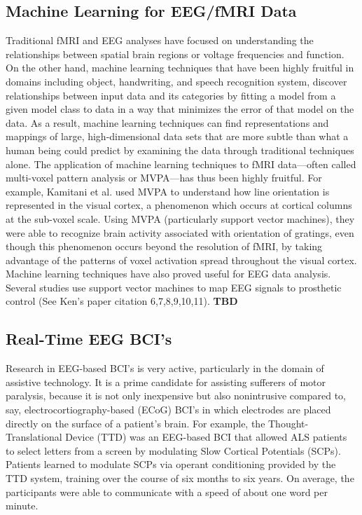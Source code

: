\documentclass[11pt]{report}
\begin{document}
\subsection{Machine Learning for EEG/fMRI Data}
Traditional fMRI and EEG analyses have focused on understanding the relationships between spatial brain regions or voltage frequencies and function.  On the other hand, machine learning techniques that have been highly fruitful in domains including object, handwriting, and speech recognition system, discover relationships between input data and its categories by fitting a model from a given model class to data in a way that minimizes the error of that model on the data.  As a result, machine learning techniques can find representations and mappings of large, high-dimensional data sets that are more subtle than what a human being could predict by examining the data through traditional techniques alone.  The application of machine learning techniques to fMRI data—often called multi-voxel pattern analysis or MVPA—has thus been highly fruitful\cite{Norman}.  For example, Kamitani et al. \cite{Kamitani} used MVPA to understand how line orientation is represented in the visual cortex, a phenomenon which occurs at cortical columns at the sub-voxel scale.   Using MVPA (particularly support vector machines), they were able to recognize brain activity associated with orientation of gratings, even though this phenomenon occurs beyond the resolution of fMRI, by taking advantage of the patterns of voxel activation spread throughout the visual cortex.  
Machine learning techniques have also proved useful for EEG data analysis.  Several studies use support vector machines to map EEG signals to prosthetic control (See Ken’s paper citation 6,7,8,9,10,11).  {\bf TBD}

\subsection{Real-Time EEG BCI's}
Research in EEG-based BCI's is very active, particularly in the domain of assistive technology.  It is a prime candidate for assisting sufferers of motor paralysis, because it is not only inexpensive but also nonintrusive compared to, say, electrocortiography-based (ECoG) BCI's in which electrodes are placed directly on the surface of a patient's brain.  For example, the Thought-Translational Device (TTD)\cite{Birbaumer} was an EEG-based BCI that allowed ALS patients to select letters from a screen by modulating Slow Cortical Potentials (SCPs).  Patients learned to modulate SCPs via operant conditioning provided by the TTD system, training over the course of six months to six years.  On average, the participants were able to communicate with a speed of about one word per minute.  
\end{document}
